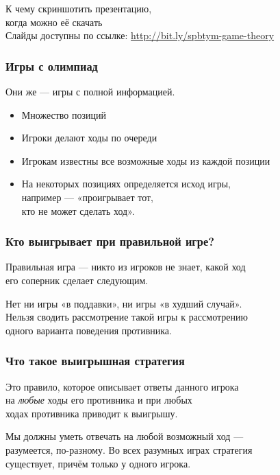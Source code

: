 \begin{frame} \begin{center}
	{\Large К чему скриншотить презентацию,\smallskip\\
		когда можно её скачать} \\ [0.9cm]
	{\small Слайды доступны по ссылке: \url{http://bit.ly/spbtym-game-theory}}
\end{center} \end{frame}

\begin{frame} \frametitle{Игры с олимпиад}
	Они же — игры с полной информацией.

\begin{itemize} \itemsep=2.25mm
	\item Множество позиций
	\item Игроки делают ходы по очереди
	\item Игрокам известны все возможные ходы из каждой позиции
	\item На некоторых позициях определяется исход игры, \\
		например — «проигрывает тот, \\
		кто не может сделать ход».
\end{itemize}
\end{frame}

\begin{frame} \frametitle{Кто выигрывает при правильной игре?}
	Правильная игра — никто из игроков не знает, какой ход \\ его соперник сделает следующим.
	
	Нет ни игры «в поддавки», ни игры «в худший случай». \\
	Нельзя сводить рассмотрение такой игры к рассмотрению \\
	одного варианта поведения противника.
\end{frame}

\begin{frame} \frametitle{Что такое выигрышная стратегия}
	Это правило, которое описывает ответы данного игрока \\
	на {\it любые} ходы его противника и при любых \\
	ходах противника приводит к выигрышу.
	
	Мы должны уметь отвечать на любой возможный ход — \\
	разумеется, по-разному. Во всех разумных играх стратегия \\
	существует, причём только у одного игрока.
\end{frame}

